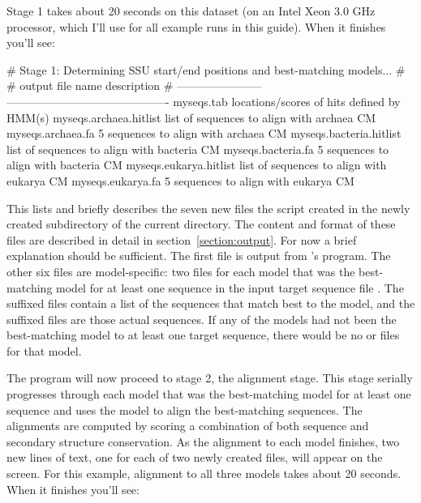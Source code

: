 Stage 1 takes about 20 seconds on this dataset (on an Intel Xeon 3.0
GHz processor, which I'll use for all example runs in this
guide). When it finishes you'll see: 

\begin{sreoutput}
# Stage 1: Determining SSU start/end positions and best-matching models...
#
# output file name         description                                
# -----------------------  -------------------------------------------
  myseqs.tab               locations/scores of hits defined by HMM(s)
  myseqs.archaea.hitlist   list of sequences to align with archaea CM
  myseqs.archaea.fa              5 sequences to align with archaea CM
  myseqs.bacteria.hitlist  list of sequences to align with bacteria CM
  myseqs.bacteria.fa             5 sequences to align with bacteria CM
  myseqs.eukarya.hitlist   list of sequences to align with eukarya CM
  myseqs.eukarya.fa              5 sequences to align with eukarya CM
\end{sreoutput}

This lists and briefly describes the seven new files the script created
in the newly created  subdirectory of the current directory.
The content and format of these files are described
in detail in section~\ref{section:output}. For now a brief explanation
should be sufficient. The first file  is output from
's  program. The other six files are
model-specific: two files for each model that was the best-matching
model for at least one sequence in the input target sequence file
. The  suffixed files contain a list
of the sequences that match best to the model, and the 
suffixed files are those actual sequences. If any of the models had
not been the best-matching model to at least one target sequence,
there would be no  or  files for that
model.

The program will now proceed to stage 2, the alignment stage. This
stage serially progresses through each model that was the
best-matching model for at least one sequence and uses the model to
align the best-matching sequences. The alignments are computed by scoring
a combination of both sequence and secondary structure conservation.
As the alignment to each model finishes, two new lines
of text, one for each of two newly created files, will appear on the
screen. For this example, alignment to all three models takes about 20
seconds. When it finishes you'll see:

